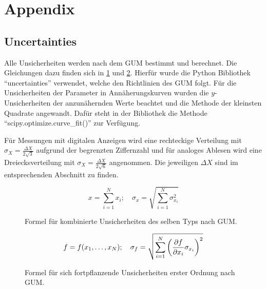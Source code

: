 \newpage
\appendix
\section{Appendix}\label{sec:appendix}

\subsection{Uncertainties}\label{sec:uncertainties}

Alle Unsicherheiten werden nach dem GUM bestimmt und berechnet.
Die Gleichungen dazu finden sich in \ref{fig:GUM_combine} und \ref{fig:GUM_formula}.
Hierfür wurde die Python Bibliothek \enquote{uncertainties} verwendet, welche den Richtlinien des GUM folgt.
Für die Unsicherheiten der Parameter in Annäherungskurven wurden die $y$-Unsicherheiten der anzunähernden Werte beachtet und die Methode der kleinsten Quadrate angewandt.
Dafür steht in der Bibliothek die Methode \enquote{scipy.optimize.curve\_fit()} zur Verfügung.

Für Messungen mit digitalen Anzeigen wird eine rechteckige Verteilung mit $\sigma_X = \frac{\Delta X}{2\sqrt{3}}$ aufgrund der begrenzten Ziffernzahl und für analoges Ablesen wird eine Dreiecksverteilung mit $\sigma_X = \frac{\Delta X}{2\sqrt{6}}$ angenommen.
Die jeweiligen $\Delta X$ sind im entsprechenden Abschnitt zu finden.

\begin{figure}[ht]
	\begin{equation*}
	x = \sum_{i=1}^{N} x_i
	;\quad
	\sigma_x = \sqrt{\sum_{i = 1}^{N} \sigma_{x_i}^2}
	\end{equation*}
	\caption{Formel für kombinierte Unsicherheiten des selben Typs nach GUM.}
	\label{fig:GUM_combine}
\end{figure}

\begin{figure}[ht]
	\begin{align*}
	f = f(x_1, \dots , x_N)
	;\quad
	\sigma_f = \sqrt{\sum_{i = 1}^{N}\left(\pdv{f}{x_i} \sigma_{x_i}\right) ^2}
	\end{align*}
	\caption{Formel für sich fortpflanzende Unsicherheiten erster Ordnung nach GUM.}
	\label{fig:GUM_formula}
\end{figure}

